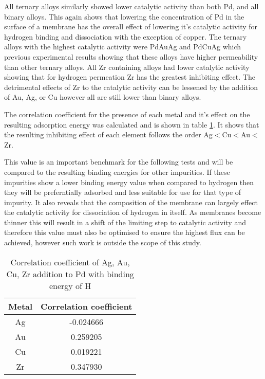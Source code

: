All ternary alloys similarly showed lower catalytic activity than both Pd, and all binary alloys. This again shows that lowering the concentration of Pd in the surface of a membrane has the overall effect of lowering it's catalytic activity for hydrogen binding and dissociation with the exception of copper. The ternary alloys with the highest catalytic activity were PdAuAg and PdCuAg which previous experimental results showing that these alloys have higher permeability than other ternary alloys. All Zr containing alloys had lower catalytic activity showing that for hydrogen permeation Zr has the greatest inhibiting effect. The detrimental effects of Zr to the catalytic activity can be lessened by the addition of Au, Ag, or Cu however all are still lower than binary alloys. 

The correlation coefficient for the presence of each metal and it's effect on the resulting adsorption energy was calculated and is shown in table \ref{corrH}. It shows that the resulting inhibiting effect of each element follows the order Ag$<$Cu$<$Au$<$Zr. 

This value is an important benchmark for the following tests and will be compared to the resulting binding energies for other impurities. If these impurities show a lower binding energy value when compared to hydrogen then they will be preferntially adsorbed and less suitable for use for that type of impurity. It also reveals that the composition of the membrane can largely effect the catalytic activity for dissociation of hydrogen in itself. As membranes become thinner this will result in a shift of the limiting step to catalytic activity and therefore this value must also be optimised to ensure the highest flux can be achieved, however such work is outside the scope of this study. 

\begin{table}[]
  \centering
  \caption{Correlation coefficient of Ag, Au, Cu, Zr addition to Pd with binding energy of H}
  \label{corrH}
  \begin{tabular}{@{}cc@{}}
  \toprule
  Metal & Correlation coefficient \\ \midrule
  Ag    & -0.024666               \\
  Au    & 0.259205                \\
  Cu    & 0.019221                \\
  Zr    & 0.347930                \\ \bottomrule
  \end{tabular}
  \end{table}

